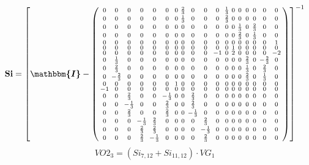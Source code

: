 \documentclass[10pt]{article} \usepackage{amsmath} \usepackage{bbold}
\begin{document}
\[ \mathbf{Si} = \left[ \boldsymbol{\mathbbm{I}}  -
\left(\begin{smallmatrix} 0 & 0 & 0 & 0 & 0 & 0 & 0 & \frac{2}{3} & 0
& 0 & 0 & \frac{1}{3} & 0 & 0 & 0 & 0 & 0 & 0 \\ 0 & 0 & 0 & 0 & 0 & 0
& 0 & \frac{1}{3} & 0 & 0 & 0 & \frac{2}{3} & 0 & 0 & 0 & 0 & 0 & 0 \\
0 & 0 & 0 & 0 & 0 & 0 & 0 & 0 & 0 & 0 & 0 & 0 & 0 & \frac{1}{3} & 0 &
\frac{2}{3} & 0 & 0 \\ 0 & 0 & 0 & 0 & 0 & 0 & 0 & 0 & 0 & 0 & 0 & 0 &
0 & \frac{2}{3} & 0 & \frac{1}{3} & 0 & 0 \\ 0 & 0 & 0 & 0 & 0 & 0 & 0
& 0 & 0 & 0 & 0 & 0 & 0 & 0 & 0 & 0 & 0 & 1 \\ 0 & 0 & 0 & 0 & 0 & 0 &
0 & 0 & 0 & 0 & 0 & 0 & 1 & 0 & 0 & 0 & 0 & 0 \\ 0 & 0 & 0 & 0 & 0 & 0
& 0 & 0 & 0 & 0 & -1 & 0 & 2 & 0 & 0 & 0 & 0 & -2 \\ 0 & \frac{1}{3} &
0 & 0 & 0 & 0 & 0 & 0 & 0 & 0 & 0 & 0 & 0 & 0 & \frac{2}{3} & 0 &
-\frac{2}{3} & 0 \\ 0 & \frac{2}{3} & 0 & 0 & 0 & 0 & 0 & 0 & 0 & 0 &
0 & 0 & 0 & 0 & \frac{1}{3} & 0 & \frac{2}{3} & 0 \\ 0 & -\frac{2}{3}
& 0 & 0 & 0 & 0 & 0 & 0 & 0 & 0 & 0 & 0 & 0 & 0 & \frac{2}{3} & 0 &
\frac{1}{3} & 0 \\ 0 & 0 & 0 & 0 & 0 & 0 & 1 & 0 & 0 & 0 & 0 & 0 & 0 &
0 & 0 & 0 & 0 & 0 \\ -1 & 0 & 0 & 0 & 0 & 0 & 0 & 0 & 0 & 0 & 0 & 0 &
0 & 0 & 0 & 0 & 0 & 0 \\ 0 & 0 & \frac{2}{3} & 0 & 0 & -\frac{1}{3} &
0 & 0 & \frac{2}{3} & 0 & 0 & 0 & 0 & 0 & 0 & 0 & 0 & 0 \\ 0 & 0 &
-\frac{1}{3} & 0 & 0 & \frac{2}{3} & 0 & 0 & \frac{2}{3} & 0 & 0 & 0 &
0 & 0 & 0 & 0 & 0 & 0 \\ 0 & 0 & \frac{2}{3} & 0 & 0 & \frac{2}{3} & 0
& 0 & -\frac{1}{3} & 0 & 0 & 0 & 0 & 0 & 0 & 0 & 0 & 0 \\ 0 & 0 & 0 &
-\frac{1}{3} & \frac{2}{3} & 0 & 0 & 0 & 0 & \frac{2}{3} & 0 & 0 & 0 &
0 & 0 & 0 & 0 & 0 \\ 0 & 0 & 0 & \frac{2}{3} & \frac{2}{3} & 0 & 0 & 0
& 0 & -\frac{1}{3} & 0 & 0 & 0 & 0 & 0 & 0 & 0 & 0 \\ 0 & 0 & 0 &
\frac{2}{3} & -\frac{1}{3} & 0 & 0 & 0 & 0 & \frac{2}{3} & 0 & 0 & 0 &
0 & 0 & 0 & 0 & 0 \end{smallmatrix}\right) \right]^{-1} \]
\[ VO2_{3}=\left(Si_{7,12} + Si_{11,12}\right)\cdot VG_{1} \]
\end{document}
